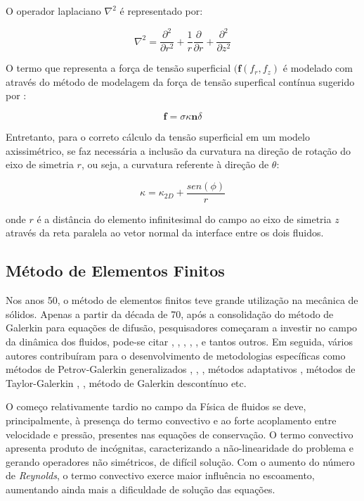 \documentclass[a4paper,portuges,12pt]{article}
\newcommand{\nvet}{\mathbf{n}}
\begin{document}
O operador laplaciano $\nabla^2$ é representado por:

\begin{equation}
	\nabla^2 
	=
	\frac{\partial^2}{\partial r^2}
	+
	\frac{1}{r}
	\frac{\partial}{\partial r}
	+
	\frac{\partial^2}{\partial z^2}
\label{eq:laplacianAxi}
\end{equation}

O termo que representa a força de tensão superficial $(\mathbf{f}(f_r,f_z)$ é
modelado com através do método de modelagem da força de tensão
superfical contínua sugerido por \cite{brackbill1992}:

\begin{equation}
	\mathbf{f} = \sigma \kappa \nvet \delta 
\label{eq:brackbill}
\end{equation}

Entretanto, para o correto cálculo da tensão superficial em um modelo
axissimétrico, se faz necessária a inclusão da curvatura na direção de
rotação do eixo de simetria $r$, ou seja, a curvatura referente à
direção de $\theta$:

\begin{equation}
	\kappa = \kappa_{2D} + \frac{sen(\phi)}{r}
\label{eq:curvAxi}
\end{equation}

\noident onde $r$ é a distância do elemento infinitesimal do campo ao
eixo de simetria $z$ através da reta paralela ao vetor normal da
interface entre os dois fluidos.

\subsection{Método de Elementos Finitos}
Nos anos 50, o método de elementos finitos teve grande utilização na
mecânica de sólidos.  Apenas a partir da década de 70, após a
consolidação do método de Galerkin para equações de difusão,
pesquisadores começaram a investir no campo da dinâmica dos fluidos,
pode-se citar \cite{zienkiewicz1965}, \cite{oden1972}, \cite{oden1998},
\cite{chung1978}, \cite{hughes1982}, \cite{pironneau1989} e tantos
outros.  Em seguida, vários autores contribuíram para o desenvolvimento
de metodologias específicas como métodos de Petrov-Galerkin
generalizados \cite{heinrich1977}, \cite{hughes1986},
\cite{johnson1987}, métodos adaptativos \cite{oden1989}, métodos de
Taylor-Galerkin \cite{donea1984}, \cite{lohner1985}, método de Galerkin
descontínuo \cite{oden1998} etc.

O começo relativamente tardio no campo da Física de fluidos se deve,
principalmente, à presença do termo convectivo e ao forte acoplamento
entre velocidade e pressão, presentes nas equações de conservação. O
termo convectivo apresenta produto de incógnitas, caracterizando a
não-linearidade do problema e gerando operadores não simétricos, de
difícil solução.  Com o aumento do número de \emph{Reynolds}, o termo
convectivo exerce maior influência no escoamento, aumentando ainda mais
a dificuldade de solução das equações.
\end{document}
